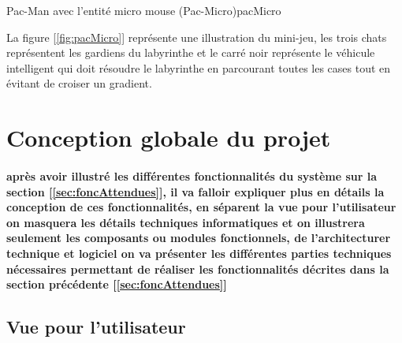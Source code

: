 {Pac-Man avec l'entité micro mouse (Pac-Micro)}{pacMicro}

La figure [\ref{fig:pacMicro}] représente une illustration du mini-jeu, les trois chats représentent 
les gardiens du labyrinthe et le carré noir représente le véhicule intelligent qui 
doit résoudre le labyrinthe en parcourant toutes les cases tout en évitant de croiser un gradient.


\section{Conception globale du projet} \label{sec:conception}
\paragraph{
   après avoir illustré les différentes fonctionnalités du système sur la
section [\ref{sec:foncAttendues}], il va falloir expliquer plus en détails
la conception de ces fonctionnalités, en séparent la vue pour l'utilisateur
on masquera les détails techniques informatiques et on illustrera seulement
les composants ou modules fonctionnels, de l'architecturer technique et
logiciel on va présenter les différentes parties techniques nécessaires
permettant de réaliser les fonctionnalités décrites dans la section
précédente [\ref{sec:foncAttendues}]}

\subsection{Vue pour l’utilisateur} \label{sec:vueUtil}
   
